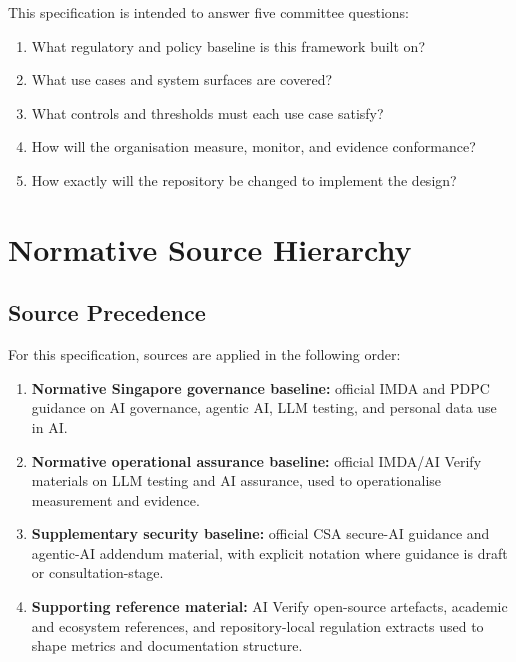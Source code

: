 \documentclass[11pt,a4paper]{article}
\begin{document}
This specification is intended to answer five committee questions:

\begin{enumerate}[nosep]
    \item What regulatory and policy baseline is this framework built on?
    \item What use cases and system surfaces are covered?
    \item What controls and thresholds must each use case satisfy?
    \item How will the organisation measure, monitor, and evidence conformance?
    \item How exactly will the repository be changed to implement the design?
\end{enumerate}

\section{Normative Source Hierarchy}

\subsection{Source Precedence}

For this specification, sources are applied in the following order:

\begin{enumerate}[nosep]
    \item \textbf{Normative Singapore governance baseline:} official IMDA and PDPC guidance on AI governance, agentic AI, LLM testing, and personal data use in AI.
    \item \textbf{Normative operational assurance baseline:} official IMDA/AI Verify materials on LLM testing and AI assurance, used to operationalise measurement and evidence.
    \item \textbf{Supplementary security baseline:} official CSA secure-AI guidance and agentic-AI addendum material, with explicit notation where guidance is draft or consultation-stage.
    \item \textbf{Supporting reference material:} AI Verify open-source artefacts, academic and ecosystem references, and repository-local regulation extracts used to shape metrics and documentation structure.
\end{enumerate}
\end{document}
